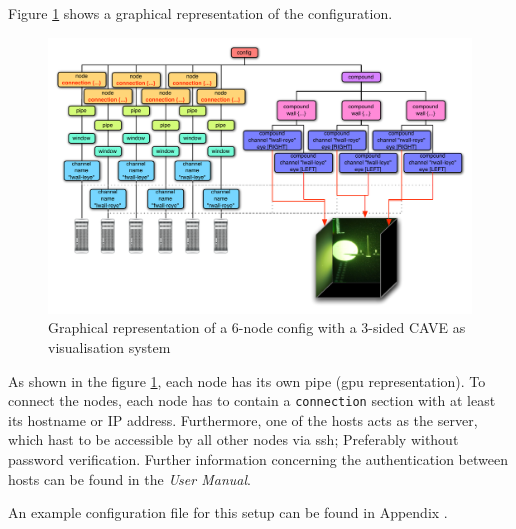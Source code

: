 Figure \ref{fig:6nodeConfig} shows a graphical representation of the configuration. 
\begin{figure}[H]
	\centering
	\includegraphics[width=1.0\textwidth]{../figures/6nodeConfig}
	\caption{Graphical representation of a 6-node config with a 3-sided CAVE as visualisation system}
	\label{fig:6nodeConfig}
\end{figure}

As shown in the figure \ref{fig:6nodeConfig}, each node has its own pipe (\gls{gpu} representation). To connect the nodes, each node has to contain a \texttt{connection} section with at least its hostname or IP address. Furthermore, one of the hosts acts as the server, which hast to be accessible by all other nodes via \gls{ssh}; Preferably without password verification. Further information concerning the authentication between hosts can be found in the \emph{User Manual}.

An example configuration file for this setup can be found in Appendix .

